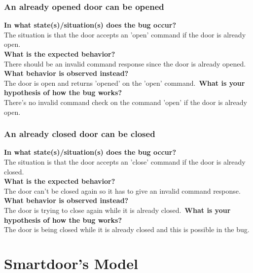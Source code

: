\documentclass{uva-inf-article}
\begin{document}
\subsubsection{An already opened door can be opened}
\textbf{In what state(s)/situation(s) does the bug occur?}\\
The situation is that the door accepts an 'open' command if the door is already open.\\
\textbf{What is the expected behavior?}\\
There should be an invalid command response since the door is already opened.\\
\textbf{What behavior is observed instead?}\\
The door is open and returns 'opened' on the 'open' command.\
\textbf{What is your hypothesis of how the bug works?}\\
There's no invalid command check on the command 'open' if the door is already open.

\subsubsection{An already closed door can be closed}
\textbf{In what state(s)/situation(s) does the bug occur?}\\
The situation is that the door accepts an 'close' command if the door is already closed.\\
\textbf{What is the expected behavior?}\\
The door can’t be closed again so it has to give an invalid command response.\\
\textbf{What behavior is observed instead?}\\
The door is trying to close again while it is already closed.\
\textbf{What is your hypothesis of how the bug works?}\\
The door is being closed while it is already closed and this is possible in the bug.

\newpage


\appendix 
\section{Smartdoor's Model}


\end{document}
